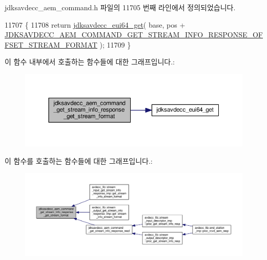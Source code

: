 jdksavdecc\+\_\+aem\+\_\+command.\+h 파일의 11705 번째 라인에서 정의되었습니다.


\begin{DoxyCode}
11707 \{
11708     \textcolor{keywordflow}{return} \hyperlink{group__eui64_ga2652311a25a6b91cddbed75c108c7031}{jdksavdecc\_eui64\_get}( base, pos + 
      \hyperlink{group__command__get__stream__info__response_ga58df48ee81e8f8cc3669eaed955f86c2}{JDKSAVDECC\_AEM\_COMMAND\_GET\_STREAM\_INFO\_RESPONSE\_OFFSET\_STREAM\_FORMAT}
       );
11709 \}
\end{DoxyCode}


이 함수 내부에서 호출하는 함수들에 대한 그래프입니다.\+:
\nopagebreak
\begin{figure}[H]
\begin{center}
\leavevmode
\includegraphics[width=350pt]{group__command__get__stream__info__response_ga7d41b7db4a004ba095081d4d2360a248_cgraph}
\end{center}
\end{figure}




이 함수를 호출하는 함수들에 대한 그래프입니다.\+:
\nopagebreak
\begin{figure}[H]
\begin{center}
\leavevmode
\includegraphics[width=350pt]{group__command__get__stream__info__response_ga7d41b7db4a004ba095081d4d2360a248_icgraph}
\end{center}
\end{figure}



